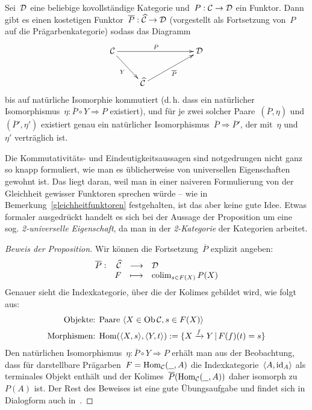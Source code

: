 \begin{prop}\label{freiekovervollst}
Sei~$\mathcal{D}$ eine beliebige kovollständige Kategorie und~$P:\mathcal{C}\to\mathcal{D}$ ein Funktor.
Dann gibt es einen kostetigen Funktor~$\overline P:\widehat{\mathcal{C}}\to\mathcal{D}$ (vorgestellt als
Fortsetzung von~$P$ auf die Prägarbenkategorie) sodass das Diagramm
\[ \xymatrix{
  \C \ar[rrr]^P \ar[rd]_Y &&& \D \\
  & \widehat\C \ar[rru]_{\overline P}
} \]
bis auf natürliche Isomorphie kommutiert (d.\,h. dass ein natürlicher
Isomorphismus~$\eta : \overline{P} \circ Y
\Rightarrow P$ existiert), und für je zwei
solcher Paare~$(\overline{P},\eta)$ und~$(\overline{P}',\eta')$ existiert genau
ein natürlicher Isomorphismus~$\overline{P} \Rightarrow \overline{P}'$, der
mit~$\eta$ und~$\eta'$ verträglich ist.
\end{prop}
Die Kommutativitäts- und Eindeutigkeitsaussagen sind notgedrungen nicht ganz so
knapp formuliert, wie man es üblicherweise von universellen Eigenschaften
gewohnt ist. Das liegt daran, weil man in einer naiveren Formulierung von der
Gleichheit gewisser Funktoren sprechen würde -- wie in
Bemerkung~\ref{gleichheitfunktoren} festgehalten, ist das aber keine gute Idee.
Etwas formaler ausgedrückt handelt es sich bei der Aussage der Proposition um eine sog.
\emph{2-universelle Eigenschaft}, da man in der \emph{2-Kategorie} der Kategorien
arbeitet.
\begin{proof}[Beweis der Proposition]
Wir können die Fortsetzung~$\overline{P}$ explizit angeben:
\[ \begin{array}{@{}rrcl@{}}
  \overline{P} : & \widehat\C &\longrightarrow& \D \\
  & F &\longmapsto& \colim\limits_{s \in F(X)} P(X)
\end{array} \]
Genauer sieht die Indexkategorie, über die der Kolimes gebildet wird, wie folgt
aus:
\begin{align*}
  \text{Objekte: } & \text{Paare $\langle X \in \operatorname{Ob}\mathcal{C}, s \in F(X) \rangle$} \\
  \text{Morphismen: } & \mathrm{Hom}(\langle X,s \rangle, \langle Y,t \rangle) :=
    \{ X \xrightarrow{f} Y \,|\, F(f)(t) = s \}
\end{align*}
Den natürlichen Isomorphismus~$\eta : \overline{P} \circ Y \Rightarrow P$
erhält man aus der Beobachtung, dass für darstellbare Prägarben~$F = \mathrm{Hom}_{\mathcal{C}}(\underline{\ \ },A)$ die
Indexkategorie~$\langle A, \mathrm{id}_A \rangle$ als terminales Objekt enthält und der
Kolimes~$\overline{P}(\mathrm{Hom}_{\mathcal{C}}(\underline{\ \ },A))$ daher isomorph zu~$P(A)$ ist. Der
Rest des Beweises ist eine gute Übungsaufgabe und findet sich in Dialogform
auch in~\cite{ncatlab:free-cocompletion}.
\end{proof}


